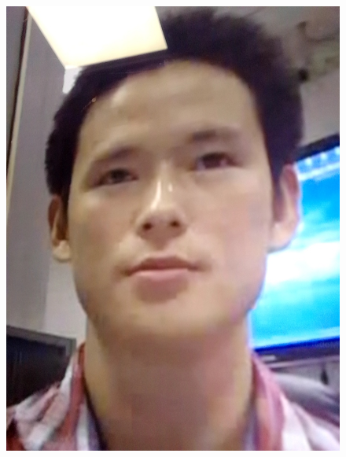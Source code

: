 \begin{figure}[h]
\centering
    \subfloat
        {\includegraphics[scale = 0.09]{figures/1_0.89185.jpg}\hspace{0.42cm}}
    \subfloat

\end{figure}
